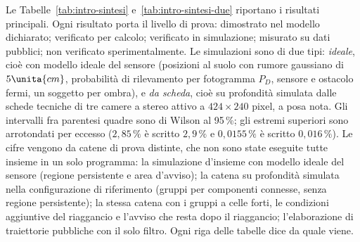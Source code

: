 Le Tabelle~\ref{tab:intro-sintesi} e~\ref{tab:intro-sintesi-due} riportano i risultati principali. Ogni risultato porta il livello di prova:  dimostrato nel modello dichiarato;  verificato per calcolo;  verificato in simulazione;  misurato su dati pubblici;  non verificato sperimentalmente. Le simulazioni sono di due tipi: \emph{ideale}, cioè con modello ideale del sensore (posizioni al suolo con rumore gaussiano di $5\unita{cm}$, probabilità di rilevamento per fotogramma $P_D$, sensore e ostacolo fermi, un soggetto per ombra), e \emph{da scheda}, cioè su profondità simulata dalle schede tecniche di tre camere a stereo attivo a $424\times240$ pixel, a posa nota. Gli intervalli fra parentesi quadre sono di Wilson al 95\,\%; gli estremi superiori sono arrotondati per eccesso ($2{,}85\,\%$ è scritto $2{,}9\,\%$ e $0{,}0155\,\%$ è scritto $0{,}016\,\%$). Le cifre vengono da catene di prova distinte, che non sono state eseguite tutte insieme in un solo programma: la simulazione d'insieme con modello ideale del sensore (regione persistente e area d'avviso); la catena su profondità simulata nella configurazione di riferimento (gruppi per componenti connesse, senza regione persistente); la stessa catena con i gruppi a celle forti, le condizioni aggiuntive del riaggancio e l'avviso che resta dopo il riaggancio; l'elaborazione di traiettorie pubbliche con il solo filtro. Ogni riga delle tabelle dice da quale viene.

